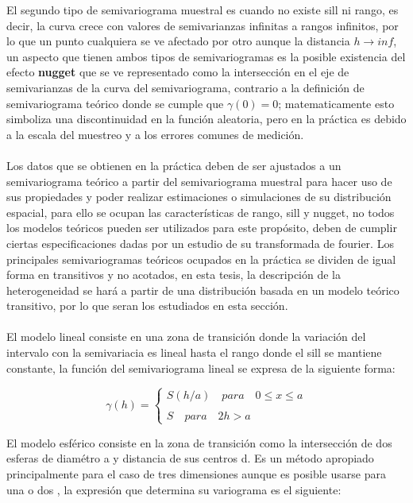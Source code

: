 El segundo tipo de semivariograma muestral es cuando no existe sill ni rango, es decir, la curva crece con valores de semivarianzas infinitas a rangos infinitos, por lo que un punto cualquiera se ve afectado por otro aunque la distancia $h{\to}inf$, un aspecto que tienen ambos tipos de semivariogramas es la posible existencia del efecto \textbf{nugget} que se ve representado como la intersección en el eje de semivarianzas de la curva del semivariograma, contrario a la definición de semivariograma teórico donde se cumple que $\gamma(0)=0$; matematicamente esto simboliza una discontinuidad en la función aleatoria, pero en la práctica es debido a la escala del muestreo y a los errores comunes de medición.
\\
\\
Los datos que se obtienen en la práctica deben de ser ajustados a un semivariograma teórico a partir del semivariograma muestral para hacer uso de sus propiedades y poder realizar estimaciones o simulaciones de su distribución espacial, para ello se ocupan las características de rango, sill y nugget, no todos los modelos teóricos pueden ser utilizados para este propósito, deben de cumplir ciertas especificaciones dadas por un estudio de su transformada de fourier. Los principales semivariogramas teóricos ocupados en la práctica se dividen de igual forma en transitivos y no acotados, en esta tesis, la descripción de la heterogeneidad se hará a partir de una distribución basada en un modelo teórico transitivo, por lo que seran los estudiados en esta sección.
\\
\\
El modelo lineal consiste en una zona de transición donde la variación del intervalo con la semivariacia es lineal hasta el rango donde el sill se mantiene constante, la función del semivariograma lineal se expresa de la siguiente forma:

\begin{equation}
\gamma(h)= \left\{ \begin{array}{lcc}
             S(h/a) \quad  para  \quad 0 \leq x \leq a \\
             \\ S \quad para \quad 2h>a  
             \end{array}
   \right.
\end{equation}

El modelo esférico consiste en la zona de transición como la intersección de dos esferas de diamétro a y distancia de sus centros d. Es un método apropiado principalmente para el caso de tres dimensiones aunque es posible usarse para una o dos , la expresión que determina su variograma es el siguiente:

